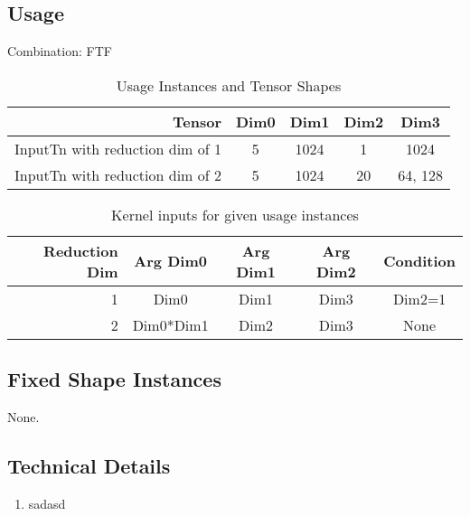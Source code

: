 \documentclass[•]{article}
\begin{document}
\subsection{Usage}
Combination: FTF
\vspace{0.5cm}
\begin{table}[htbp] %
\caption{Usage Instances and Tensor Shapes}
	\begin{center}
		\begin{tabular}{|r|c|c|c|c|} 
		\hline	
		Tensor & Dim0 & Dim1 & Dim2 & Dim3\\ 
		\hline	
		InputTn with reduction dim of 1 &
			5 &
			1024 &
			1 &
			1024 \\ 
		\hline	
		InputTn with reduction dim of 2 &
			5 &
			1024 &
			20 &
			64, 128 \\ 
		\hline
		\end{tabular}
	\end{center}
\end{table}

\begin{table}[htbp] %
\caption{Kernel inputs for given usage instances}
	\begin{center}
		\begin{tabular}{|r|c|c|c|c|} 
		\hline	
		Reduction Dim & Arg Dim0 & Arg Dim1 & Arg Dim2 & Condition\\ 
		\hline	
		1 &
			Dim0 &
			Dim1 &
			Dim3 &
			Dim2=1 \\ 
		\hline	
		2 &
			Dim0*Dim1 &
			Dim2 &
			Dim3 &
			None \\ 
		\hline
		\end{tabular}
	\end{center}
\end{table}

\subsection{Fixed Shape Instances}
None.

\subsection{Technical Details}
\begin{enumerate}
\item sadasd
\end{enumerate}
\end{document}
